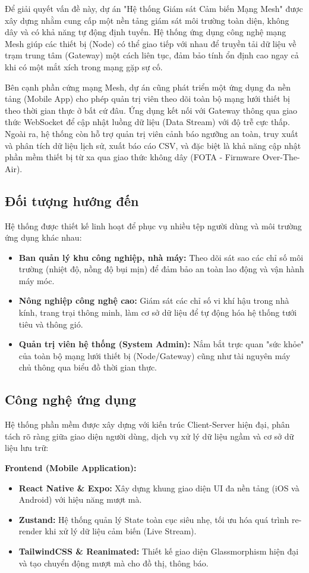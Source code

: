 \documentclass{article}
\begin{document}
Để giải quyết vấn đề này, dự án "Hệ thống Giám sát Cảm biến Mạng Mesh" được xây dựng nhằm cung cấp một nền tảng giám sát môi trường toàn diện, không dây và có khả năng tự động định tuyến. Hệ thống ứng dụng công nghệ mạng Mesh giúp các thiết bị (Node) có thể giao tiếp với nhau để truyền tải dữ liệu về trạm trung tâm (Gateway) một cách liên tục, đảm bảo tính ổn định cao ngay cả khi có một mắt xích trong mạng gặp sự cố.

Bên cạnh phần cứng mạng Mesh, dự án cũng phát triển một ứng dụng đa nền tảng (Mobile App) cho phép quản trị viên theo dõi toàn bộ mạng lưới thiết bị theo thời gian thực ở bất cứ đâu. Ứng dụng kết nối với Gateway thông qua giao thức WebSocket để cập nhật luồng dữ liệu (Data Stream) với độ trễ cực thấp. Ngoài ra, hệ thống còn hỗ trợ quản trị viên cảnh báo ngưỡng an toàn, truy xuất và phân tích dữ liệu lịch sử, xuất báo cáo CSV, và đặc biệt là khả năng cập nhật phần mềm thiết bị từ xa qua giao thức không dây (FOTA - Firmware Over-The-Air).

\subsection{Đối tượng hướng đến}
Hệ thống được thiết kế linh hoạt để phục vụ nhiều tệp người dùng và môi trường ứng dụng khác nhau:
\begin{itemize}
    \item \textbf{Ban quản lý khu công nghiệp, nhà máy:} Theo dõi sát sao các chỉ số môi trường (nhiệt độ, nồng độ bụi mịn) để đảm bảo an toàn lao động và vận hành máy móc.
    \item \textbf{Nông nghiệp công nghệ cao:} Giám sát các chỉ số vi khí hậu trong nhà kính, trang trại thông minh, làm cơ sở dữ liệu để tự động hóa hệ thống tưới tiêu và thông gió.
    \item \textbf{Quản trị viên hệ thống (System Admin):} Nắm bắt trực quan "sức khỏe" của toàn bộ mạng lưới thiết bị (Node/Gateway) cũng như tài nguyên máy chủ thông qua biểu đồ thời gian thực.
\end{itemize}

\subsection{Công nghệ ứng dụng}
Hệ thống phần mềm được xây dựng với kiến trúc Client-Server hiện đại, phân tách rõ ràng giữa giao diện người dùng, dịch vụ xử lý dữ liệu ngầm và cơ sở dữ liệu lưu trữ:

\textbf{Frontend (Mobile Application):}
\begin{itemize}
    \item \textbf{React Native \& Expo:} Xây dựng khung giao diện UI đa nền tảng (iOS và Android) với hiệu năng mượt mà.
    \item \textbf{Zustand:} Hệ thống quản lý State toàn cục siêu nhẹ, tối ưu hóa quá trình re-render khi xử lý dữ liệu cảm biến (Live Stream).
    \item \textbf{TailwindCSS \& Reanimated:} Thiết kế giao diện Glassmorphism hiện đại và tạo chuyển động mượt mà cho đồ thị, thông báo.
\end{itemize}
\end{document}
